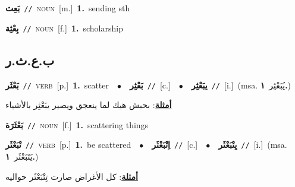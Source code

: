\documentclass[10pt,a4paper,twoside]{article} %
\begin{document}
\begin{multicols}{2}
{\setlength\topsep{0pt}\textbf{\foreignlanguage{arabic}{بَعِث}}\ {\color{gray}\texttt{//}\color{black}}\ \textsc{noun}\ [m.]\ \textbf{1.}~sending sth\ } \vspace{2mm}

{\setlength\topsep{0pt}\textbf{\foreignlanguage{arabic}{بِعْثِة}}\ {\color{gray}\texttt{//}\color{black}}\ \textsc{noun}\ [f.]\ \textbf{1.}~scholarship\ } \vspace{2mm}

\vspace{-3mm}
\subsection*{\color{blue}\foreignlanguage{arabic}{ب.ع.ث.ر}\color{blue}{}} 

{\setlength\topsep{0pt}\textbf{\foreignlanguage{arabic}{بَعْثَر}}\ {\color{gray}\texttt{//}\color{black}}\ \textsc{verb}\ [p.]\ \textbf{1.}~scatter\ \ $\bullet$\ \ \setlength\topsep{0pt}\textbf{\foreignlanguage{arabic}{بَعْثِر}}\ {\color{gray}\texttt{//}\color{black}}\ [c.]\ \ $\bullet$\ \ \setlength\topsep{0pt}\textbf{\foreignlanguage{arabic}{يبَعْثِر}}\ {\color{gray}\texttt{//}\color{black}}\ [i.]\ \color{gray}(msa. \foreignlanguage{arabic}{يُبَعْثِر}~\foreignlanguage{arabic}{\textbf{١.}})\color{black}\  \begin{flushright}\color{gray}\foreignlanguage{arabic}{\textbf{\underline{\foreignlanguage{arabic}{أمثلة}}}: بحبش هيك لما ينعجق ويصير يبَعْثِر بالأشياء}\end{flushright}\color{black}} \vspace{2mm}

{\setlength\topsep{0pt}\textbf{\foreignlanguage{arabic}{بَعْثَرَة}}\ {\color{gray}\texttt{//}\color{black}}\ \textsc{noun}\ [f.]\ \textbf{1.}~scattering things\ } \vspace{2mm}

{\setlength\topsep{0pt}\textbf{\foreignlanguage{arabic}{تْبَعْثَر}}\ {\color{gray}\texttt{//}\color{black}}\ \textsc{verb}\ [p.]\ \textbf{1.}~be scattered\ \ $\bullet$\ \ \setlength\topsep{0pt}\textbf{\foreignlanguage{arabic}{اِتْبَعْثَر}}\ {\color{gray}\texttt{//}\color{black}}\ [c.]\ \ $\bullet$\ \ \setlength\topsep{0pt}\textbf{\foreignlanguage{arabic}{يِتْبَعْثَر}}\ {\color{gray}\texttt{//}\color{black}}\ [i.]\ \color{gray}(msa. \foreignlanguage{arabic}{يَتَبَعْثَر}~\foreignlanguage{arabic}{\textbf{١.}})\color{black}\  \begin{flushright}\color{gray}\foreignlanguage{arabic}{\textbf{\underline{\foreignlanguage{arabic}{أمثلة}}}: كل الأغراض صارت تِتْبَعْثَر حواليه}\end{flushright}\color{black}} \vspace{2mm}


\end{multicols}
\end{document}
